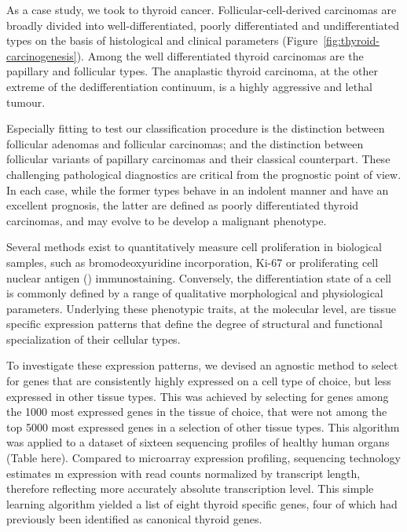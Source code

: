 As a case study, we took to thyroid cancer.  Follicular-cell-derived carcinomas
are broadly divided into well-differentiated, poorly differentiated and
undifferentiated types on the basis of histological and clinical parameters
(Figure~\ref{fig:thyroid-carcinogenesis}).\cite{kondo_pathogenetic_2006} Among
the well differentiated thyroid carcinomas are the papillary and follicular
types.  The anaplastic thyroid carcinoma, at the other extreme of the
dedifferentiation continuum, is a highly aggressive and lethal tumour.

Especially fitting to test our classification procedure is the distinction
between follicular adenomas and follicular carcinomas; and the distinction
between follicular variants of papillary carcinomas and their classical
counterpart.  These challenging pathological
diagnostics\cite{lubitz_molecular_2005} are critical from the prognostic point
of view.  In each case, while the former types behave in an indolent manner and
have an excellent prognosis, the latter are defined as poorly differentiated
thyroid carcinomas, and may evolve to be develop a malignant phenotype.

Several methods exist to quantitatively measure cell proliferation in biological
samples, such as bromodeoxyuridine incorporation, Ki-67 or proliferating cell
nuclear antigen () immunostaining.  Conversely, the
differentiation state of a cell is commonly defined by a range of qualitative
morphological and physiological parameters.  Underlying these phenotypic traits,
at the molecular level, are tissue specific expression patterns that define the
degree of structural and functional specialization of their cellular types.

To investigate these expression patterns, we devised an agnostic method to
select for genes that are consistently highly expressed on a cell type of
choice, but less expressed in other tissue types.  This was achieved by
selecting for genes among the \num{1000} most expressed genes in the tissue of
choice, that were not among the top \num{5000} most expressed genes in a
selection of other tissue types.  This algorithm was applied to a dataset of
sixteen  sequencing profiles of healthy human organs (Table
here).  Compared to microarray expression profiling,  sequencing
technology estimates m expression with read counts normalized by
transcript length, therefore reflecting more accurately absolute transcription
level.\cite{wang_rna-seq:_2009}  This simple learning algorithm yielded a list
of eight thyroid specific genes, four of which had previously been identified as
canonical thyroid genes.

